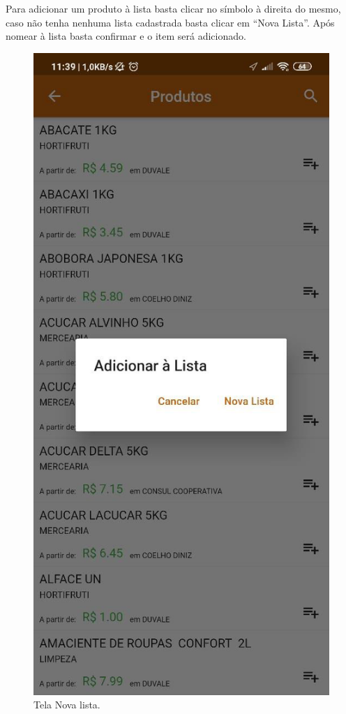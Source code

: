 Para adicionar um produto à lista basta clicar no símbolo à direita do mesmo, caso não tenha nenhuma lista cadastrada basta clicar em “Nova Lista”. Após nomear à lista basta confirmar e o item será adicionado.
\begin{figure}[H]
    \centering
    \caption{Tela Nova lista.}
    \includegraphics[scale=0.3]{Imagens/Print04.png}
\end{figure}


